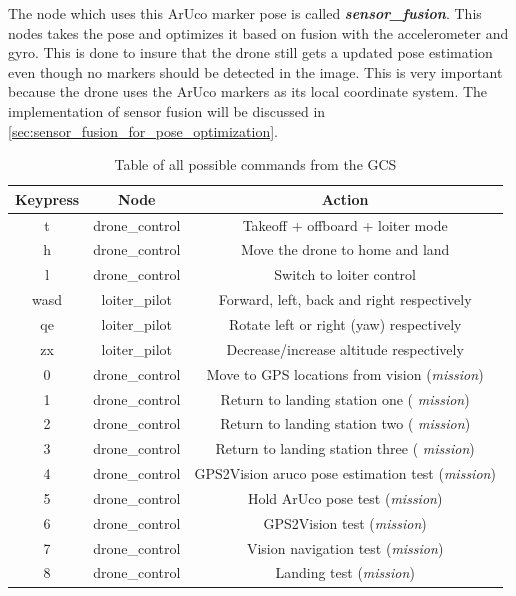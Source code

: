 \documentclass[../Head/report.tex]{subfiles}
\begin{document}
The node which uses this ArUco marker pose is called \textit{\textbf{sensor\_fusion}}. This nodes takes the pose and optimizes it based on fusion with the accelerometer and gyro. This is done to insure that the drone still gets a updated pose estimation even though no markers should be detected in the image. This is very important because the drone uses the ArUco markers as its local coordinate system. The implementation of sensor fusion will be discussed in \ref{sec:sensor_fusion_for_pose_optimization}.   

\begin{table}[H]
\centering
\begin{tabular}{ccc}
\hline
\textbf{Keypress} & \textbf{Node} & \textbf{Action}                                    \\ \hline
t                 & drone\_control & Takeoff + offboard + loiter mode         \\
h                 & drone\_control & Move the drone to home and land         \\
l                 & drone\_control & Switch to loiter control 
\\
wasd              & loiter\_pilot & Forward, left, back and right respectively           \\
qe                & loiter\_pilot & Rotate left or right (yaw) respectively             \\
zx                & loiter\_pilot & Decrease/increase altitude respectively
\\
0                 & drone\_control & Move to GPS locations from vision (\textit{mission})
\\
1                 & drone\_control & Return to landing station one ( \textit{mission})
\\
2                 & drone\_control & Return to landing station two ( \textit{mission})
\\
3                 & drone\_control & Return to landing station three ( \textit{mission})
\\
4                 & drone\_control & GPS2Vision aruco pose estimation test (\textit{mission})  
\\
5                 & drone\_control & Hold ArUco pose test (\textit{mission})  
\\
6                 & drone\_control & GPS2Vision test (\textit{mission})  
\\
7                 & drone\_control & Vision navigation test (\textit{mission})
\\
8                 & drone\_control & Landing test (\textit{mission})  
\end{tabular}
\caption{Table of all possible commands from the GCS}
\label{tab:ros_commands}
\end{table}
\end{document}
